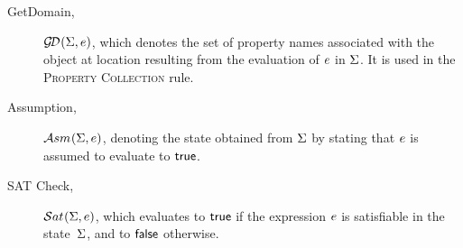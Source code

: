 \begin{description}
               
             
  \item[GetDomain,] $\mathcal{G\!D}_{}(\Sigma, e)$, which denotes the 
           set of property names associated with the object at location resulting from the evaluation of $e$ 
           in $\Sigma$. It is used in the \textsc{Property Collection} rule.
   
   
   \item[Assumption,] $\mathcal{A}{sm}_{}(\Sigma, e)$, denoting the state obtained from $\Sigma$ by stating that $e$ is assumed to evaluate to ${\sf true}$. 
  
   \item[SAT Check,] $\mathcal{S}at_{}(\Sigma, e)$, which evaluates to ${\sf true}$ if the \jsil expression $e$ is satisfiable in the state~$\Sigma$, and to ${\sf false}$ otherwise.
             
\end{description}

